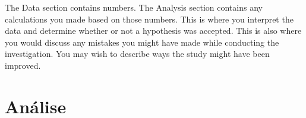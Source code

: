 

The Data section contains numbers. The Analysis section contains any calculations you made based on those numbers. This is where you interpret the data and determine whether or not a hypothesis was accepted. This is also where you would discuss any mistakes you might have made while conducting the investigation. You may wish to describe ways the study might have been improved.



\section{Análise}
\label{analise}


